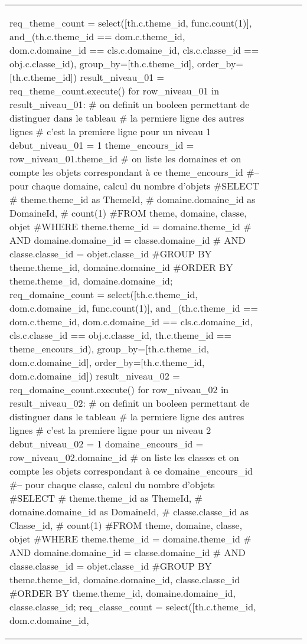 \documentclass[12pt,titlepage]{book}
\begin{document}
\begin{supertabular}{|p{7.5cm}|p{7.5cm}|p{7.5cm}|c|p{10cm}|}
\begin{lbdpython}
req_theme_count = select([th.c.theme_id, func.count(1)],
                  and_(th.c.theme_id == dom.c.theme_id,
                       dom.c.domaine_id == cls.c.domaine_id,
                       cls.c.classe_id == obj.c.classe_id),
                  group_by=[th.c.theme_id],
                  order_by=[th.c.theme_id])
result_niveau_01 = req_theme_count.execute()
for row_niveau_01 in result_niveau_01:
   # on definit un booleen permettant de distinguer dans le tableau
   # la permiere ligne des autres lignes
   # c'est la premiere ligne pour un niveau 1
   debut_niveau_01 = 1
   theme_encours_id = row_niveau_01.theme_id
   # on liste les domaines et on compte les objets correspondant à ce theme_encours_id
   #-- pour chaque domaine, calcul du nombre d'objets
   #SELECT
   #   theme.theme_id as ThemeId,
   #   domaine.domaine_id as DomaineId,
   #   count(1)
   #FROM theme, domaine, classe, objet
   #WHERE theme.theme_id = domaine.theme_id
   #  AND domaine.domaine_id = classe.domaine_id
   #  AND classe.classe_id = objet.classe_id
   #GROUP BY theme.theme_id, domaine.domaine_id
   #ORDER BY theme.theme_id, domaine.domaine_id;
   req_domaine_count = select([th.c.theme_id, dom.c.domaine_id, func.count(1)],
                       and_(th.c.theme_id == dom.c.theme_id,
                            dom.c.domaine_id == cls.c.domaine_id,
                            cls.c.classe_id == obj.c.classe_id,
                            th.c.theme_id == theme_encours_id),
                       group_by=[th.c.theme_id, dom.c.domaine_id],
                       order_by=[th.c.theme_id, dom.c.domaine_id])
   result_niveau_02 = req_domaine_count.execute()
   for row_niveau_02 in result_niveau_02:
      # on definit un booleen permettant de distinguer dans le tableau
      # la permiere ligne des autres lignes
      # c'est la premiere ligne pour un niveau 2
      debut_niveau_02 = 1
      domaine_encours_id = row_niveau_02.domaine_id
      # on liste les classes et on compte les objets correspondant à ce domaine_encours_id
      #-- pour chaque classe, calcul du nombre d'objets
      #SELECT
      #   theme.theme_id as ThemeId,
      #   domaine.domaine_id as DomaineId,
      #   classe.classe_id as Classe_id,
      #   count(1)
      #FROM theme, domaine, classe, objet
      #WHERE theme.theme_id = domaine.theme_id 
      #  AND domaine.domaine_id = classe.domaine_id
      #  AND classe.classe_id = objet.classe_id
      #GROUP BY theme.theme_id, domaine.domaine_id, classe.classe_id
      #ORDER BY theme.theme_id, domaine.domaine_id, classe.classe_id;
      req_classe_count = select([th.c.theme_id, dom.c.domaine_id,

\end{lbdpython}
\end{supertabular}
\end{document}
